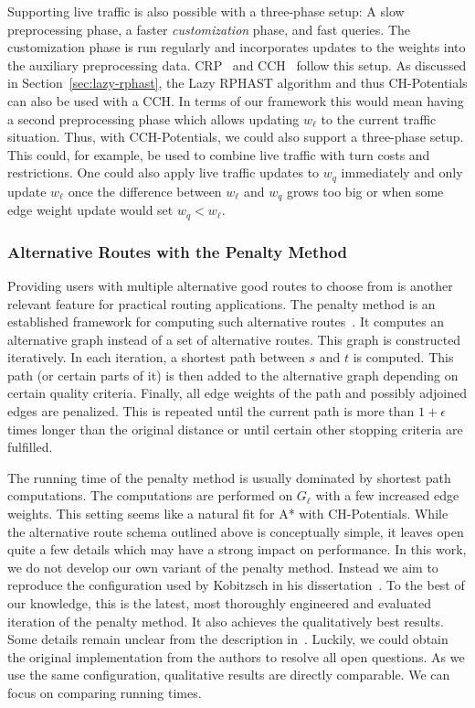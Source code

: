 \documentclass[manuscript,review]{acmart}
\begin{document}
Supporting live traffic is also possible with a three-phase setup:
A slow preprocessing phase, a faster \emph{customization} phase, and fast queries.
The customization phase is run regularly and incorporates updates to the weights into the auxiliary preprocessing data.
CRP~\cite{dgpw-crprn-13} and CCH~\cite{dsw-cch-15} follow this setup.
As discussed in Section~\ref{sec:lazy-rphast}, the Lazy RPHAST algorithm and thus CH-Potentials can also be used with a CCH.
In terms of our framework this would mean having a second preprocessing phase which allows updating $w_\ell$ to the current traffic situation.
Thus, with CCH-Potentials, we could also support a three-phase setup.
This could, for example, be used to combine live traffic with turn costs and restrictions.
One could also apply live traffic updates to $w_q$ immediately and only update $w_\ell$ once the difference between $w_\ell$ and $w_q$ grows too big or when some edge weight update would set $w_q < w_\ell$.

\subsubsection{Alternative Routes with the Penalty Method}

Providing users with multiple alternative good routes to choose from is another relevant feature for practical routing applications.
The penalty method is an established framework for computing such alternative routes~\cite{bdgs-argrn-11,krs-eepma-13,pz-iarp-13,kobitzsch2015alternative}.
It computes an alternative graph instead of a set of alternative routes.
This graph is constructed iteratively.
In each iteration, a shortest path between $s$ and $t$ is computed.
This path (or certain parts of it) is then added to the alternative graph depending on certain quality criteria.
Finally, all edge weights of the path and possibly adjoined edges are penalized.
This is repeated until the current path is more than $1 + \epsilon$ times longer than the original distance or until certain other stopping criteria are fulfilled.

The running time of the penalty method is usually dominated by shortest path computations.
The computations are performed on $G_{\ell}$ with a few increased edge weights.
This setting seems like a natural fit for A* with CH-Potentials.
While the alternative route schema outlined above is conceptually simple, it leaves open quite a few details which may have a strong impact on performance.
In this work, we do not develop our own variant of the penalty method.
Instead we aim to reproduce the configuration used by Kobitzsch in his dissertation~\cite{kobitzsch2015alternative}.
To the best of our knowledge, this is the latest, most thoroughly engineered and evaluated iteration of the penalty method.
It also achieves the qualitatively best results.
Some details remain unclear from the description in~\cite{kobitzsch2015alternative}.
Luckily, we could obtain the original implementation from the authors to resolve all open questions.
As we use the same configuration, qualitative results are directly comparable.
We can focus on comparing running times.
\end{document}

